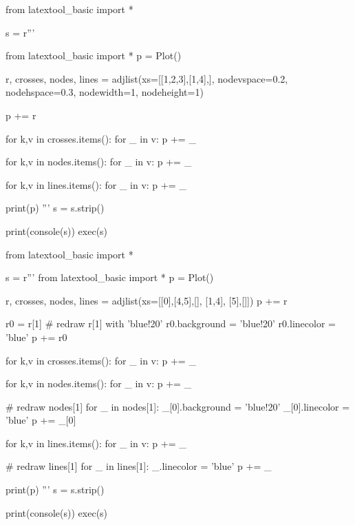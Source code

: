\begin{python}
from latextool_basic import *

s = r'''

from latextool_basic import *
p = Plot()

r, crosses, nodes, lines = adjlist(xs=[[1,2,3],[1,4],],
                                   nodevspace=0.2, nodehspace=0.3,
                                   nodewidth=1, nodeheight=1)

p += r

for k,v in crosses.items():
    for _ in v: p += _

for k,v in nodes.items():
    for _ in v: p += _

for k,v in lines.items():
    for _ in v: p += _

print(p)
'''
s = s.strip()

print(console(s))
exec(s)
\end{python}



























\begin{python}
from latextool_basic import *

s = r'''
from latextool_basic import *
p = Plot()

r, crosses, nodes, lines = adjlist(xs=[[0],[4,5],[], [1,4], [5],[]])
p += r

r0 = r[1] # redraw r[1] with 'blue!20'
r0.background = 'blue!20'
r0.linecolor = 'blue'
p += r0

for k,v in crosses.items():
    for _ in v: p += _

for k,v in nodes.items():
    for _ in v: p += _

# redraw nodes[1]
for _ in nodes[1]:
    _[0].background = 'blue!20'
    _[0].linecolor = 'blue'
    p += _[0]

for k,v in lines.items():
    for _ in v: p += _

# redraw lines[1]
for _ in lines[1]:
    _.linecolor = 'blue'
    p += _
    
print(p)
'''
s = s.strip()

print(console(s))
exec(s)
\end{python}










